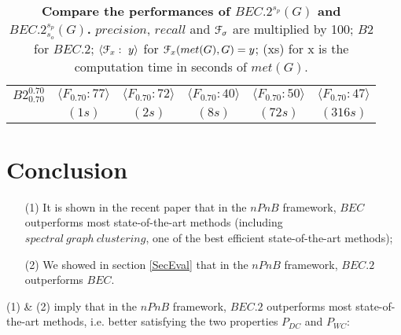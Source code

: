 \documentclass[12pt]{article}
\theoremstyle{thmstyleone}%
\theoremstyle{definition}
\begin{document}
\begin{table}[!ht]
\begin{tabular}{| l | c c c  | c c c | c c c | c c c | c c c | }
\textbf{$B2^{0.70}_{0.70}$}& \multicolumn{3}{c|}{$\langle F_{0.70}:77 \rangle$ }& \multicolumn{3}{c|}{$\langle F_{0.70}:72 \rangle$ }& \multicolumn{3}{c|}{$\langle F_{0.70}:40 \rangle$ }& \multicolumn{3}{c|}{$\langle F_{0.70}:50 \rangle$ }& \multicolumn{3}{c|}{$\langle F_{0.70}:47 \rangle$ } \\
& \multicolumn{3}{c|}{$(1s)$}& \multicolumn{3}{c|}{$(2s)$}& \multicolumn{3}{c|}{$(8s)$}& \multicolumn{3}{c|}{$(72s)$}& \multicolumn{3}{c|}{$(316s)$} \\ \hline

\end{tabular}
\bigskip
    \caption{{\bf Compare the performances of $BEC.2^{s_p}(G)$ and $BEC.2^{s_p}_{s_o}(G)$.}
    $precision$, $recall$ and $\EuScript{F}_{\sigma}$ are multiplied by 100;
    $B2$ for $BEC.2$;
    $\langle \EuScript{F}_{x}:~y \rangle$ for $\EuScript{F}_{x}(met(G),G)=y$;
    (xs) for x is the computation time in seconds of $met(G)$.
    \label{PerfTerrainOVP}}
\end{table}
\normalsize

\section{Conclusion\label{Conclusion}}
\begin{itemize}
\item[(1)] It is shown in the recent paper \cite{Gaume_BEC1_2025} that in the $nPnB$ framework, $BEC$ outperforms most state-of-the-art methods (including $spectral~graph~clustering$, one of the best efficient state-of-the-art methods);
\item[(2)] We showed in section \ref{SecEval} that in the $nPnB$ framework, $BEC.2$ outperforms $BEC$.
\end{itemize}

\noindent
(1) \& (2) imply that in the $nPnB$ framework, $BEC.2$ outperforms most state-of-the-art methods, i.e. better satisfying the two properties $P_{DC}$ and $P_{WC}$:
\end{document}
